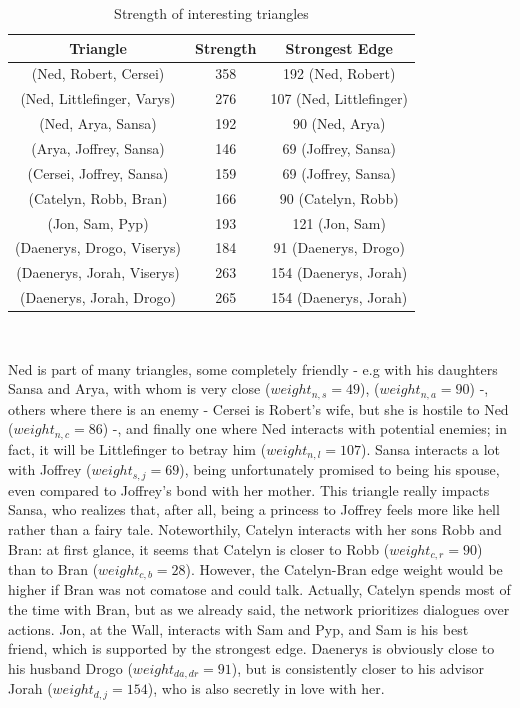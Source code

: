 \documentclass[10pt,twocolumn,letterpaper]{article}
\begin{document}
\begin{table}[!h]
    \centering
    \small
    \begin{tabular}{c|c|c}
        Triangle & Strength & Strongest Edge  \\
        \hline
        \small{(Ned, Robert, Cersei)} & 358 & 192 \small{(Ned, Robert)} \\
        \small{(Ned, Littlefinger, Varys)} & 276 & 107 \small{(Ned, Littlefinger)}\\
        \small{(Ned, Arya, Sansa)} & 192 & 90 \small{(Ned, Arya)}\\
        \small{(Arya, Joffrey, Sansa)} & 146 & 69 \small{(Joffrey, Sansa)}\\
        \small{(Cersei, Joffrey, Sansa)} & 159 & 69 \small{(Joffrey, Sansa)}\\
        \small{(Catelyn, Robb, Bran)} & 166 & 90 \small{(Catelyn, Robb)}\\
        \small{(Jon, Sam, Pyp)} & 193 & 121 \small{(Jon, Sam)} \\
        \small{(Daenerys, Drogo, Viserys)} & 184 & 91 \small{(Daenerys, Drogo)}\\
        \small{(Daenerys, Jorah, Viserys)} & 263 & 154 \small{(Daenerys, Jorah)}\\
        \small{(Daenerys, Jorah, Drogo)} & 265 & 154 \small{(Daenerys, Jorah)}\\
        \hline 
    \end{tabular} \\
    \caption{\small{Strength of interesting triangles}}
    \label{tab:tr_s1}
\end{table}

Ned is part of many triangles, some completely friendly - e.g with his daughters Sansa and Arya, with whom is very close ($weight_{n,s}=49$), ($weight_{n,a}=90$) -, others where there is an enemy - Cersei is Robert's wife, but she is hostile to Ned ($weight_{n,c}=86$) -, and finally one where Ned interacts with potential enemies; in fact, it will be Littlefinger to betray him ($weight_{n,l}=107$). Sansa interacts a lot with Joffrey ($weight_{s,j}=69$), being unfortunately promised to being his spouse, even compared to Joffrey's bond with her mother. This triangle really impacts Sansa, who realizes that, after all, being a princess to Joffrey feels more like hell rather than a fairy tale.
Noteworthily, Catelyn interacts with her sons Robb and Bran: at first glance, it seems that Catelyn is closer to Robb ($weight_{c,r}=90$) than to Bran ($weight_{c,b}=28$). However, the Catelyn-Bran edge weight would be higher if Bran was not comatose and could talk. Actually, Catelyn spends most of the time with Bran, but as we already said, the network prioritizes dialogues over actions.
Jon, at the Wall, interacts with Sam and Pyp, and Sam is his best friend, which is supported by the strongest edge.
Daenerys is obviously close to his husband Drogo ($weight_{da,dr}=91$), but is consistently closer to his advisor Jorah ($weight_{d,j}=154$), who is also secretly in love with her.
\end{document}
